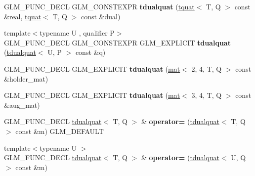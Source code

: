 \begin{DoxyCompactItemize}
\item 
\mbox{\label{structglm_1_1tdualquat_ab86d3cf3f902945d1d774505b32f9f56}} 
G\+L\+M\+\_\+\+F\+U\+N\+C\+\_\+\+D\+E\+CL G\+L\+M\+\_\+\+C\+O\+N\+S\+T\+E\+X\+PR {\bfseries tdualquat} (\hyperlink{structglm_1_1tquat}{tquat}$<$ T, Q $>$ const \&real, \hyperlink{structglm_1_1tquat}{tquat}$<$ T, Q $>$ const \&dual)
\item 
\mbox{\label{structglm_1_1tdualquat_a1fbee84d447e37ac7542412dab82cbcf}} 
{\footnotesize template$<$typename U , qualifier P$>$ }\\G\+L\+M\+\_\+\+F\+U\+N\+C\+\_\+\+D\+E\+CL G\+L\+M\+\_\+\+C\+O\+N\+S\+T\+E\+X\+PR G\+L\+M\+\_\+\+E\+X\+P\+L\+I\+C\+IT {\bfseries tdualquat} (\hyperlink{structglm_1_1tdualquat}{tdualquat}$<$ U, P $>$ const \&q)
\item 
\mbox{\label{structglm_1_1tdualquat_aaf58d434e56496978c027c3b7c021cfb}} 
G\+L\+M\+\_\+\+F\+U\+N\+C\+\_\+\+D\+E\+CL G\+L\+M\+\_\+\+E\+X\+P\+L\+I\+C\+IT {\bfseries tdualquat} (\hyperlink{structglm_1_1mat}{mat}$<$ 2, 4, T, Q $>$ const \&holder\+\_\+mat)
\item 
\mbox{\label{structglm_1_1tdualquat_a3f557639a4737d4852919fdbbb39e133}} 
G\+L\+M\+\_\+\+F\+U\+N\+C\+\_\+\+D\+E\+CL G\+L\+M\+\_\+\+E\+X\+P\+L\+I\+C\+IT {\bfseries tdualquat} (\hyperlink{structglm_1_1mat}{mat}$<$ 3, 4, T, Q $>$ const \&aug\+\_\+mat)
\item 
\mbox{\label{structglm_1_1tdualquat_a87cbf5213f512c3b14d9fb53e3314aa8}} 
G\+L\+M\+\_\+\+F\+U\+N\+C\+\_\+\+D\+E\+CL \hyperlink{structglm_1_1tdualquat}{tdualquat}$<$ T, Q $>$ \& {\bfseries operator=} (\hyperlink{structglm_1_1tdualquat}{tdualquat}$<$ T, Q $>$ const \&m) G\+L\+M\+\_\+\+D\+E\+F\+A\+U\+LT
\item 
\mbox{\label{structglm_1_1tdualquat_aa657c3d88bec1eff0cb387db5d180c15}} 
{\footnotesize template$<$typename U $>$ }\\G\+L\+M\+\_\+\+F\+U\+N\+C\+\_\+\+D\+E\+CL \hyperlink{structglm_1_1tdualquat}{tdualquat}$<$ T, Q $>$ \& {\bfseries operator=} (\hyperlink{structglm_1_1tdualquat}{tdualquat}$<$ U, Q $>$ const \&m)
\item 
\mbox{\label{structglm_1_1tdualquat_ac2a4ef8f0875deefefae629a274efa6e}} 

\end{DoxyCompactItemize}
